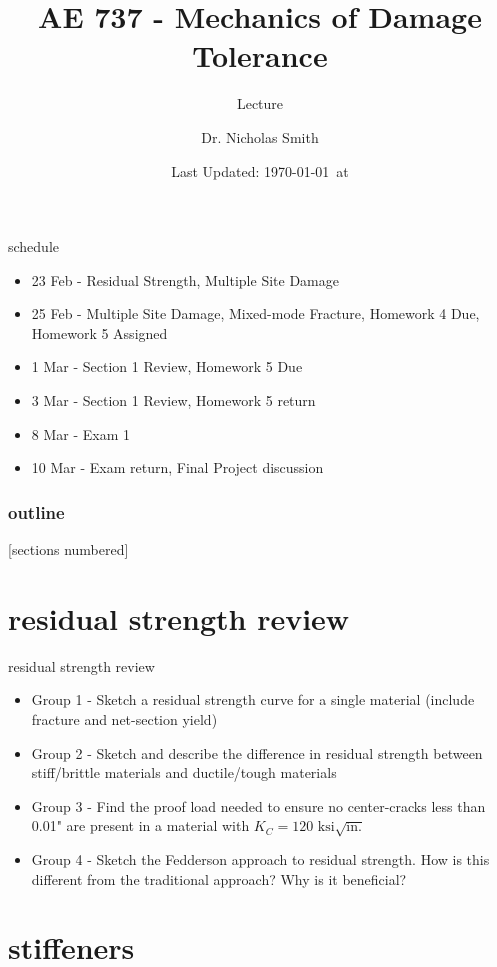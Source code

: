 \documentclass[10pt]{beamer}
\title{AE 737 - Mechanics of Damage Tolerance}
\subtitle{Lecture \arabic{lecture}}
\date{Last Updated: \today\ at \DTMcurrenttime}
\author{Dr. Nicholas Smith}
\institute{Wichita State University, Department of Aerospace Engineering}
\begin{document}
\maketitle
\begin{frame}{schedule}
	\begin{itemize}
		\item 23 Feb - Residual Strength, Multiple Site Damage
		\item 25 Feb - Multiple Site Damage, Mixed-mode Fracture, Homework 4 Due, Homework 5 Assigned
		\item 1 Mar - Section 1 Review, Homework 5 Due
		\item 3 Mar - Section 1 Review, Homework 5 return
		\item 8 Mar - Exam 1
		\item 10 Mar - Exam return, Final Project discussion
	\end{itemize}
\end{frame}

\begin{frame}
  \frametitle{outline}
  [sections numbered]
  \tableofcontents[hideallsubsections]
\end{frame}

\section{residual strength review}

\begin{frame}{residual strength review}
	\begin{itemize}
		\item Group 1 - Sketch a residual strength curve for a single material (include fracture and net-section yield)
		\item Group 2 - Sketch and describe the difference in residual strength between stiff/brittle materials and ductile/tough materials
		\item Group 3 - Find the proof load needed to ensure no center-cracks less than 0.01" are present in a material with $K_C = 120 \text{ ksi}\sqrt{\text{in.}}$
		\item Group 4 - Sketch the Fedderson approach to residual strength. How is this different from the traditional approach? Why is it beneficial?
	\end{itemize}
\end{frame}

\section{stiffeners}
\end{document}
